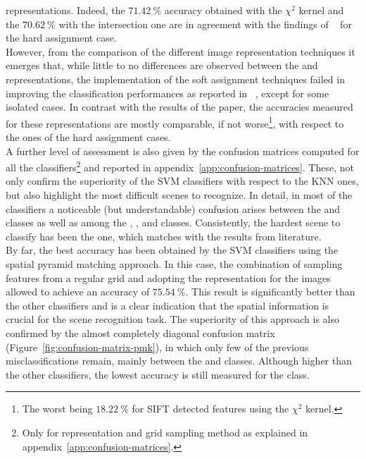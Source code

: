 \documentclass[../main.tex]{subfiles}
\begin{document}
representations.
Indeed, the $\SI{71.42}{\percent}$ accuracy obtained with the $\chi^2$ kernel
and the $\SI{70.62}{\percent}$ with the intersection one are in agreement with
the findings of ~\cite{gemert} for the hard assignment
case.\\
However, from the comparison of the different image representation techniques it
emerges that, while little to no differences are observed between the
 and  representations, the implementation of the soft
assignment techniques failed in improving the classification performances as
reported in ~\cite{gemert}, except for some
isolated cases. In contrast with the results of the paper, the accuracies
measured for these representations are mostly comparable, if not worse\footnote{The worst being
$\SI{18.22}{\percent}$ for SIFT detected features using the $\chi^2$ kernel.}, with respect
to the ones of the hard assignment cases.\\
A further level of assessment is also given by the confusion matrices computed
for all the classifiers\footnote{Only for  representation and grid
	sampling method as explained in appendix~\ref{app:confusion-matrices}.} and reported in appendix~\ref{app:confusion-matrices}.
These, not only confirm the superiority of the SVM classifiers with respect to
the KNN ones, but also highlight the most difficult scenes to
recognize. In detail, in most of the classifiers a noticeable
(but understandable) confusion arises between the  and
 classes as well as among the , ,
 and  classes. Consistently, the hardest scene
to classify has been the  one, which matches with the results
from literature.\\
By far, the best accuracy has been obtained by the SVM classifiers
using the spatial pyramid matching approach. In this case, the combination of  sampling features
from a regular grid and adopting the  representation for the images
allowed to achieve an accuracy of $\SI{75.54}{\percent}$. This result is
significantly better than the other classifiers and is a clear indication that
the spatial information is crucial for the scene recognition task. The
superiority of this approach is also confirmed by the almost completely diagonal
confusion matrix (Figure~\ref{fig:confusion-matrix-pmk}), in which only few of
the previous misclassifications remain, mainly between the  and  classes. Although higher than the other classifiers, the lowest accuracy is still measured for the  class.\\
\end{document}
